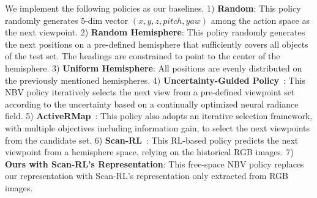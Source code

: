     We implement the following policies as our baselines. 1) \textbf{Random}: This policy randomly generates 5-dim vector $(x, y, z, pitch, yaw)$ among the action space as the next viewpoint. 2) \textbf{Random Hemisphere}: This policy randomly generates the next positions on a pre-defined hemisphere that sufficiently covers all objects of the test set. The headings are constrained to point to the center of the hemisphere. 3) \textbf{Uniform Hemisphere}: All positions are evenly distributed on the previously mentioned hemispheres. 4) \textbf{Uncertainty-Guided Policy}~\citep{lee2022uncertainty}: This NBV policy iteratively selects the next view from a pre-defined viewpoint set according to the uncertainty based on a continually optimized neural radiance field. 5) \textbf{ActiveRMap}~\citep{zhan2022activermap}: This policy also adopts an iterative selection framework, with multiple objectives including information gain, to select the next viewpoints from the candidate set. 6) \textbf{Scan-RL}~\citep{peralta2020next}: This RL-based policy predicts the next viewpoint from a hemisphere space, relying on the historical RGB images. 7) \textbf{Ours with Scan-RL's Representation}: This free-space NBV policy replaces our representation with Scan-RL's representation only extracted from RGB images.


